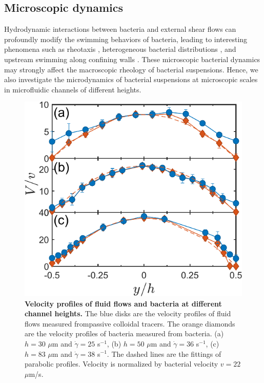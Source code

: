 \subsection{Microscopic dynamics}
Hydrodynamic interactions between bacteria and external shear flows can profoundly modify the swimming behaviors
of bacteria, leading to interesting phenomena such as rheotaxis \cite{Marcos2012}, heterogeneous bacterial distributions \cite{Rusconi2014}, and upstream swimming along confining walls \cite{Hill2007, Nash2010, Costanzo2012, Kaya2012}. These microscopic bacterial dynamics may strongly affect the macroscopic rheology of
bacterial suspensions. Hence, we also investigate the microdynamics of bacterial suspensions at microscopic scales
in microfluidic channels of different heights.

\begin{figure}[!ht]
	\begin{center}
	\includegraphics[width=4 in]{Figs/3-Rheo/3.pdf}
	\end{center}
	\caption[Velocity profiles of fluid flows and bacteria at different channel heights]
	{
	\textbf{Velocity profiles of fluid flows and bacteria at different channel heights.}
  The blue disks are the velocity profiles of fluid flows measured frompassive colloidal tracers. The orange diamonds are the velocity profiles of bacteria measured from bacteria.
  (a) $h = 30$ $\mu$m and $\dot\gamma = 25$ s$^{-1}$,
  (b) $h = 50$ $\mu$m and $\dot\gamma = 36$ s$^{-1}$,
  (c) $h = 83$ $\mu$m and $\dot\gamma = 38$ s$^{-1}$.
  The dashed lines are the fittings of parabolic profiles. Velocity is normalized by bacterial velocity $v = 22$ $\mu$m/s.
	}
	\label{fig:3-velocity-profile}
\end{figure}

